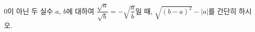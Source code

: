 0이 아닌 두 실수 $a$, $b$에 대하여 $\dfrac{\sqrt{a}}{\sqrt{b}}=-\sqrt{\dfrac{a}{b}}$일 때, $\sqrt{(b-a)^2}-|a|$를 간단히 하시오.
